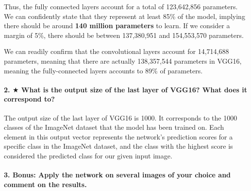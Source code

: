 Thus, the fully connected layers account for a total of 123,642,856 parameters. We can confidently state that they represent at least 85\% of the model, implying there should be around \textbf{140 million parameters} to learn. If we consider a margin of 5\%, there should be between 137,380,951 and 154,553,570 parameters.

We can readily confirm that the convolutional layers account for 14,714,688 parameters, meaning that there are actually 138,357,544 parameters in VGG16, meaning the fully-connected layers accounts to 89\% of parameters.









\paragraph{2. $\bigstar$ What is the output size of the last layer of VGG16? What does it correspond to?}
The output size of the last layer of VGG16 is 1000. It corresponds to the 1000 classes of the ImageNet dataset that the model has been trained on. Each element in this output vector represents  the network's prediction scores for a specific class in the ImageNet dataset, and the class with the highest score is considered the predicted class for our given input image.

\paragraph{3. \textbf{Bonus}: Apply the network on several images of your choice and comment on the results.}

